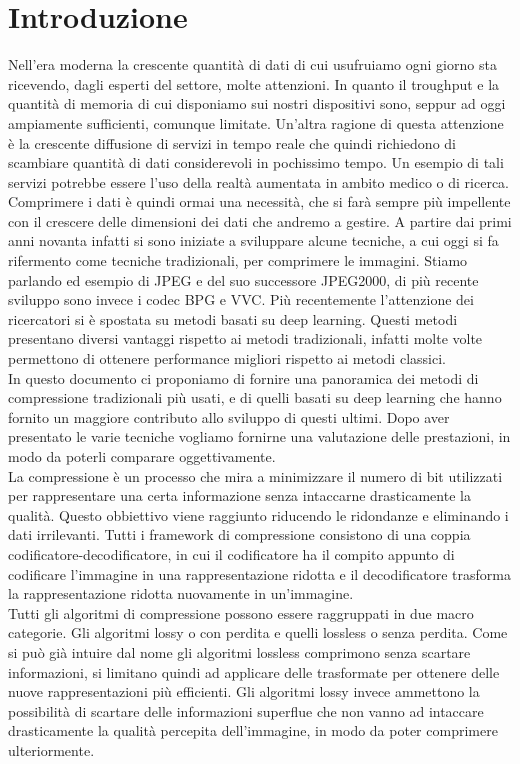 \chapter*{Introduzione}
Nell’era moderna la crescente quantità di dati di cui usufruiamo ogni giorno sta ricevendo, dagli esperti del settore, molte attenzioni. In quanto il troughput e la quantità di memoria di cui disponiamo sui nostri dispositivi sono, seppur ad oggi ampiamente sufficienti, comunque limitate. Un’altra ragione di questa attenzione è la crescente diffusione di servizi in tempo reale che quindi richiedono di scambiare quantità di dati considerevoli in pochissimo tempo. Un esempio di tali servizi potrebbe essere l’uso della realtà aumentata in ambito medico o di ricerca. Comprimere i dati è quindi ormai una necessità, che si farà sempre più impellente con il crescere delle dimensioni dei dati che andremo a gestire.
A partire dai primi anni novanta infatti si sono iniziate a sviluppare alcune tecniche, a cui oggi si fa rifermento come tecniche tradizionali, per comprimere le immagini. Stiamo parlando ed esempio di JPEG e del suo successore JPEG2000, di più recente sviluppo sono invece i codec BPG e VVC.
Più recentemente l’attenzione dei ricercatori si è spostata su metodi basati su deep learning. Questi metodi presentano diversi vantaggi rispetto ai metodi tradizionali, infatti molte volte permettono di ottenere performance migliori rispetto ai metodi classici.\\
In questo documento ci proponiamo di fornire una panoramica dei metodi di compressione tradizionali più usati, e di quelli basati su deep learning che hanno fornito un maggiore contributo allo sviluppo di questi ultimi. Dopo aver presentato le varie tecniche vogliamo fornirne una valutazione delle prestazioni, in modo da poterli comparare oggettivamente.\\
La compressione è un processo che mira a minimizzare il numero di bit utilizzati per rappresentare una certa informazione senza intaccarne drasticamente la qualità. Questo obbiettivo viene raggiunto riducendo le ridondanze e eliminando i dati irrilevanti.
Tutti i framework di compressione consistono di una coppia codificatore-decodificatore, in cui il codificatore ha il compito appunto di codificare l’immagine in una rappresentazione ridotta e il decodificatore trasforma la rappresentazione ridotta nuovamente in un’immagine.\\
Tutti gli algoritmi di compressione possono essere raggruppati in due macro categorie. Gli algoritmi lossy o con perdita e quelli lossless o senza perdita. Come si può già intuire dal nome gli algoritmi lossless comprimono senza scartare informazioni, si limitano quindi ad applicare delle trasformate per ottenere delle nuove rappresentazioni più efficienti. Gli algoritmi lossy invece ammettono la possibilità di scartare delle informazioni superflue che non vanno ad intaccare drasticamente la qualità percepita dell’immagine, in modo da poter comprimere ulteriormente.
